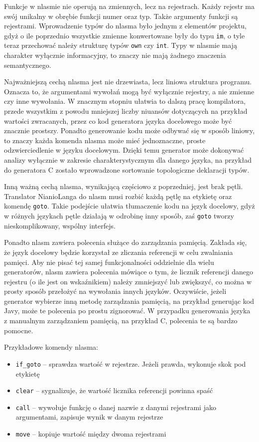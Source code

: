 \documentclass[licencjacka]{pracamgr}
\begin{document}
Funkcje w nlasmie nie operują na zmiennych, lecz na rejestrach. Każdy rejestr ma swój unikalny w obrębie funkcji numer oraz typ. Także argumenty funkcji są rejestrami. Wprowadzenie typów do nlasma było jednym z elementów projektu, gdyż o ile poprzednio wszystkie zmienne konwertowane były do typu \texttt{im}, o tyle teraz przechować należy strukturę typów \texttt{own} czy \texttt{int}. Typy w nlasmie mają charakter wyłącznie informacyjny, to znaczy nie mają żadnego znaczenia semantycznego.

Najważniejszą cechą nlasma jest nie drzewiasta, lecz liniowa struktura programu. Oznacza to, że argumentami wywołań mogą być wyłącznie rejestry, a nie zmienne czy inne wywołania. W znacznym stopniu ułatwia to dalszą pracę kompilatora, przede wszystkim z powodu mniejszej liczby niuansów dotyczących na przykład wartości zwracanych, przez co kod generatora języka docelowego może być znacznie prostszy. Ponadto generowanie kodu może odbywać się w sposób liniowy, to znaczy każda komenda nlasma może mieć jednoznaczne, proste odzwierciedlenie w języku docelowym. Dzięki temu generator może dokonywać analizy wyłącznie w zakresie charakterystycznym dla danego języka, na przykład do generatora C zostało wprowadzone sortowanie topologiczne deklaracji typów.

Inną ważną cechą nlasma, wynikającą częściowo z poprzedniej, jest brak pętli. Translator NianioLanga do nlasm musi rozbić każdą pętlę na etykietę oraz komendę \texttt{goto}. Takie podejście ułatwia tłumaczenie kodu na język docelowy, gdyż w różnych językach pętle działają w odrobinę inny sposób, zaś \texttt{goto} tworzy nieskomplikowany, wspólny interfejs.

Ponadto nlasm zawiera polecenia służące do zarządzania pamięcią. Zakłada się, że język docelowy będzie korzystał ze zliczania referencji w celu zwalniania pamięci. Aby nie pisać tej samej funkcjonalności oddzielnie dla wielu generatorów, nlasm zawiera polecenia mówiące o tym, że licznik referencji danego rejestru (o ile jest on wskaźnikiem) należy zmniejszyć lub zwiększyć, co można w prosty sposób przełożyć na wywołania innych języków. Oczywiście, jeżeli generator wybierze inną metodę zarządzania pamięcią, na przykład generując kod Javy, może te polecenia po prostu zignorować. W przypadku generowania języka z manualnym zarządzaniem pamięcią, na przykład C, polecenia te są bardzo pomocne.


Przykładowe komendy nlasma:
\begin{itemize}
\item \texttt{if\_goto} -- sprawdza wartość w rejestrze. Jeżeli prawda, wykonuje skok pod etykietę
\item \texttt{clear} -- sygnalizuje, że wartość licznika referencji powinna spaść
\item \texttt{call} -- wywołuje funkcję o danej nazwie z danymi rejestrami jako argumentami, zapisuje wynik w danym rejestrze
\item \texttt{move} -- kopiuje wartość między dwoma rejestrami
\end{itemize}
\end{document}
